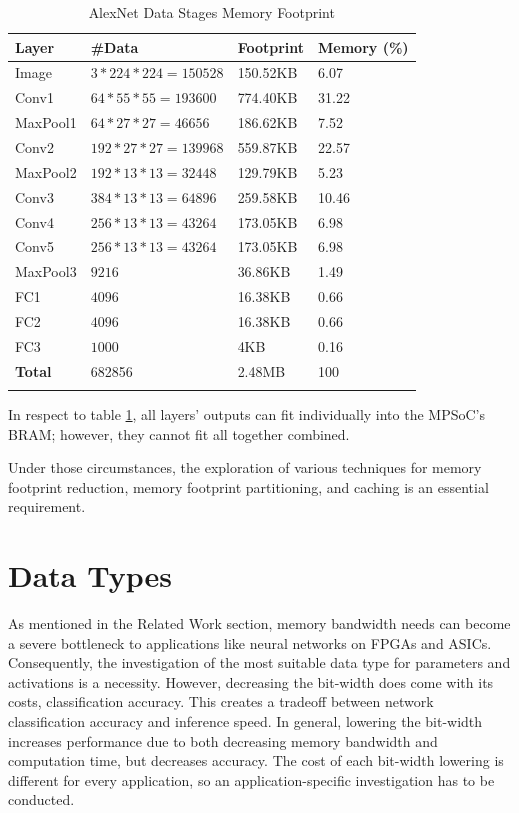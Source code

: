 \begin{table}[H]
	\caption{AlexNet Data Stages Memory Footprint}
	\label{tab:AlexNet-Data-Stages-Memory-Footprint}
	\centering
	\begin{tabular}{llll}
		\toprule
		\textbf{Layer} & \textbf{\#Data} & \textbf{Footprint} & \textbf{Memory (\%)}  \\
		\midrule
			Image & $3 * 224 * 224 = 150528$ & 150.52KB & 6.07 \\
			Conv1 & $64 * 55 * 55 = 193600$ & 774.40KB & 31.22 \\
			MaxPool1 & $64 * 27 * 27 = 46656$ & 186.62KB & 7.52 \\
			Conv2 & $192 * 27 * 27 = 139968$ & 559.87KB & 22.57 \\
			MaxPool2 & $192 * 13 * 13 = 32448$ & 129.79KB & 5.23 \\
			Conv3 & $384 * 13 * 13 = 64896$ & 259.58KB & 10.46 \\
			Conv4 & $256 * 13 * 13 = 43264$ & 173.05KB & 6.98 \\
			Conv5 & $256 * 13 * 13 = 43264$ & 173.05KB & 6.98 \\
			MaxPool3 & $9216$ & 36.86KB & 1.49 \\
			FC1 & $4096$ & 16.38KB & 0.66 \\
			FC2 & $4096$ & 16.38KB & 0.66 \\
			FC3 & $1000$ & 4KB & 0.16 \\
		\midrule
			\textbf{Total} & 682856 & 2.48MB & 100 \\
		\bottomrule\\
	\end{tabular}
\end{table}

In respect to table \ref{tab:AlexNet-Data-Stages-Memory-Footprint}, all layers' outputs can fit individually into the MPSoC's BRAM; however, they cannot fit all together combined.

Under those circumstances, the exploration of various techniques for memory footprint reduction, memory footprint partitioning, and caching is an essential requirement.

\section{Data Types}
As mentioned in the Related Work section, memory bandwidth needs can become a severe bottleneck to applications like neural networks on FPGAs and ASICs. Consequently, the investigation of the most suitable data type for parameters and activations is a necessity. However, decreasing the bit-width does come with its costs, classification accuracy. This creates a tradeoff between network classification accuracy and inference speed. In general, lowering the bit-width increases performance due to both decreasing memory bandwidth and computation time, but decreases accuracy. The cost of each bit-width lowering is different for every application, so an application-specific investigation has to be conducted.

